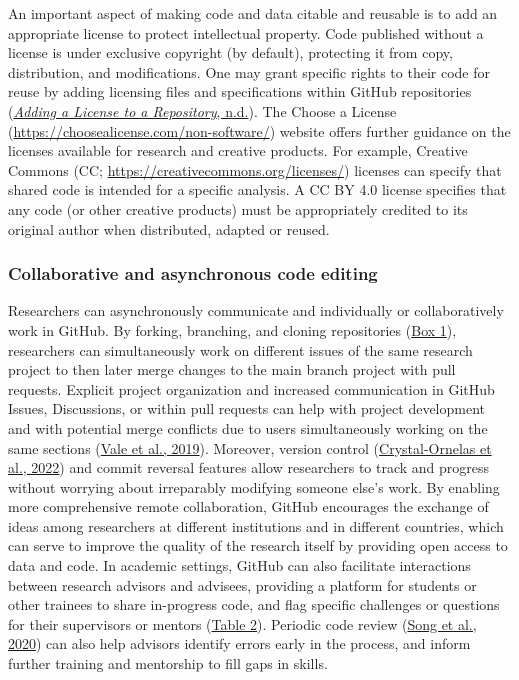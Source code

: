 An important aspect of making code and data citable and reusable is to add an appropriate license to protect intellectual property.
Code published without a license is under exclusive copyright (by default), protecting it from copy, distribution, and modifications.
One may grant specific rights to their code for reuse by adding licensing files and specifications within GitHub repositories (\protect\hyperlink{ref-TOsASkn5}{\emph{Adding a License to a Repository}, n.d.}).
The Choose a License (\url{https://choosealicense.com/non-software/}) website offers further guidance on the licenses available for research and creative products.
For example, Creative Commons (CC; \url{https://creativecommons.org/licenses/}) licenses can specify that shared code is intended for a specific analysis.
A CC BY 4.0 license specifies that any code (or other creative products) must be appropriately credited to its original author when distributed, adapted or reused.

\hypertarget{collaborative-and-asynchronous-code-editing}{%
\subsubsection{Collaborative and asynchronous code editing}\label{collaborative-and-asynchronous-code-editing}}

Researchers can asynchronously communicate and individually or collaboratively work in GitHub.
By forking, branching, and cloning repositories (\protect\hyperlink{definitions}{Box 1}), researchers can simultaneously work on different issues of the same research project to then later merge changes to the main branch project with pull requests.
Explicit project organization and increased communication in GitHub Issues, Discussions, or within pull requests can help with project development and with potential merge conflicts due to users simultaneously working on the same sections (\protect\hyperlink{ref-1BJcvyTmV}{Vale et al., 2019}).
Moreover, version control (\protect\hyperlink{ref-K7nbP1Ty}{Crystal-Ornelas et al., 2022}) and commit reversal features allow researchers to track and progress without worrying about irreparably modifying someone else's work.
By enabling more comprehensive remote collaboration, GitHub encourages the exchange of ideas among researchers at different institutions and in different countries, which can serve to improve the quality of the research itself by providing open access to data and code.
In academic settings, GitHub can also facilitate interactions between research advisors and advisees, providing a platform for students or other trainees to share in-progress code, and flag specific challenges or questions for their supervisors or mentors (\protect\hyperlink{tbl:roles}{Table 2}).
Periodic code review (\protect\hyperlink{ref-hm9PaCLD}{Song et al., 2020}) can also help advisors identify errors early in the process, and inform further training and mentorship to fill gaps in skills.

